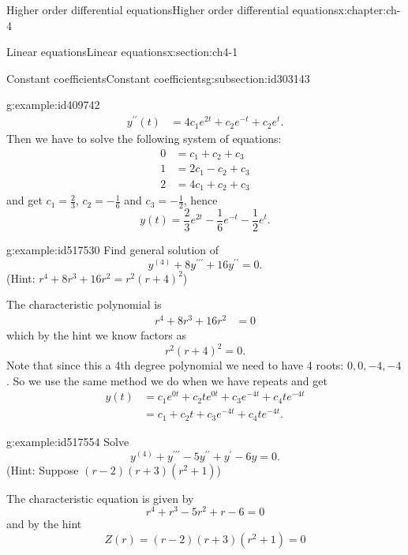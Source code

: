 \documentclass[oneside,10pt,]{book}
\numberwithin{equation}{section}
\numberwithin{equation}{section}
\newcommand{\amp}{&}
\begin{document}
\begin{chapterptx}{Higher order differential equations}{}{Higher order differential equations}{}{}{x:chapter:ch-4}
\begin{sectionptx}{Linear equations}{}{Linear equations}{}{}{x:section:ch4-1}
\begin{subsectionptx}{Constant coefficients}{}{Constant coefficients}{}{}{g:subsection:id303143}
\begin{example}{}{g:example:id409742}
\begin{align*}
y^{\prime\prime}(t) \amp =4c_{1}e^{2t}+c_{2}e^{-t}+c_{2}e^{t}.
\end{align*}
Then we have to solve the following system of equations:%
\begin{align*}
0 \amp =c_{1}+c_{2}+c_{3}\\
1 \amp =2c_{1}-c_{2}+c_{3}\\
2 \amp =4c_{1}+c_{2}+c_{3}
\end{align*}
and get \(c_{1}=\frac{2}{3}\), \(c_{2}=-\frac{1}{6}\) and \(c_{3}=-\frac{1}{2}\), hence%
\begin{equation*}
y(t)=\frac{2}{3}e^{2t}-\frac{1}{6}e^{-t}-\frac{1}{2}e^{t}.
\end{equation*}
%
\end{example}
\begin{example}{}{g:example:id517530}%
Find general solution of%
\begin{equation*}
y^{(4)}+8y^{\prime\prime\prime}+16y^{\prime\prime}=0.
\end{equation*}
(Hint: \(r^{4}+8r^{3}+16r^{2}=r^{2}\left(r+4\right)^{2}\))%
\par
The characteristic polynomial is%
\begin{align*}
r^{4}+8r^{3}+16r^{2} \amp =0
\end{align*}
which by the hint we know factors as%
\begin{equation*}
r^{2}\left(r+4\right)^{2}=0.
\end{equation*}
Note that since this a 4th degree polynomial we need to have 4 roots: \(0,0,-4,-4\). So we use the same method we do when we have repeats and get%
\begin{align*}
y(t) \amp =c_{1}e^{0t}+c_{2}te^{0t}+c_{3}e^{-4t}+c_{4}te^{-4t}\\
\amp =c_{1}+c_{2}t+c_{3}e^{-4t}+c_{4}te^{-4t}.
\end{align*}
%
\end{example}
\begin{example}{}{g:example:id517554}%
Solve%
\begin{equation*}
y^{(4)}+y^{\prime\prime\prime}-5y^{\prime\prime}+y^{\prime}-6y=0.
\end{equation*}
(Hint: Suppose \(\left(r-2\right)\left(r+3\right)\left(r^{2}+1\right)\))%
\par
The characteristic equation is given by%
\begin{equation*}
r^{4}+r^{3}-5r^{2}+r-6=0
\end{equation*}
and by the hint%
\begin{equation*}
Z(r)=\left(r-2\right)\left(r+3\right)\left(r^{2}+1\right)=0

\end{equation*}
\end{example}
\end{subsectionptx}
\end{sectionptx}
\end{chapterptx}
\end{document}
